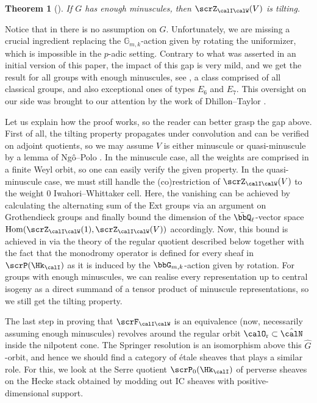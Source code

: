 \documentclass[10pt, reqno]{amsart}
\theoremstyle{plain}
\newtheorem{theorem}{Theorem}[section]
\theoremstyle{definition}
\numberwithin{equation}{section}
\begin{document}
	\begin{theorem}[]
		If $G$ has enough minuscules, then $\scrZ_{\calI\calW}(V)$ is tilting.
	\end{theorem}
	
	Notice that in \cite{AB09} there is no assumption on $G$. Unfortunately, we are missing a crucial ingredient replacing the $\mathbb{G}_{m,k}$-action given by rotating the uniformizer, which is impossible in the $p$-adic setting. Contrary to what was asserted in an initial version of this paper, the impact of this gap is very mild, and we get the result for all groups with enough minuscules, see , a class comprised of all classical groups, and also exceptional ones of types $E_6$ and $E_7$. This oversight on our side was brought to our attention by the work of Dhillon--Taylor \cite{DT25}. 
	
	Let us explain how the proof works, so the reader can better grasp the gap above. First of all, the tilting property propagates under convolution and can be verified on adjoint quotients, so we may assume $V$ is either minuscule or quasi-minuscule by a lemma of Ngô--Polo \cite{NP01}. In the minuscule case, all the weights are comprised in a finite Weyl orbit, so one can easily verify the given property. In the quasi-minuscule case, we must still handle the (co)restriction of $\scrZ_{\calI\calW}(V)$ to the weight $0$ Iwahori--Whittaker cell. Here, the vanishing can be achieved by calculating the alternating sum of the $\mathrm{Ext}$ groups via an argument on Grothendieck groups and finally bound the dimension of the $\bar{\bbQ}_\ell$-vector space $\mathrm{Hom}(\scrZ_{\calI\calW}(1),\scrZ_{\calI\calW}(V))$ accordingly. Now, this bound is achieved in \cite{AB09} via the theory of the regular quotient described below together with the fact that the monodromy operator is defined for every sheaf in $\scrP(\Hk_{\calI})$ as it is induced by the $\bbG_{m,k}$-action given by rotation. For groups with enough minuscules, we can realise every representation up to central isogeny as a direct summand of a tensor product of minuscule representations, so we still get the tilting property.
	
	The last step in proving that $\scrF_{\calI\calW}$ is an equivalence (now, necessarily assuming enough minuscules) revolves around the regular orbit $\calO_{\mathrm{r}} \subset \hat{\calN}$ inside the nilpotent cone. The Springer resolution is an isomorphism above this $\hat{G}$-orbit, and hence we should find a category of étale sheaves that plays a similar role. For this, we look at the Serre quotient $\scrP_0(\Hk_{\calI})$ of perverse sheaves on the Hecke stack obtained by modding out IC sheaves with positive-dimensional support.
	
\end{document}
